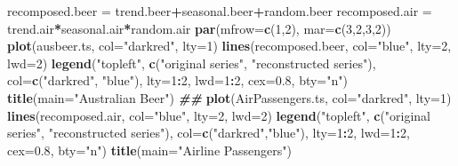 \documentclass[
]{book}
\newenvironment{Shaded}{\begin{snugshade}}{\end{snugshade}}
\newcommand{\AttributeTok}[1]{\textcolor[rgb]{0.13,0.29,0.53}{#1}}
\newcommand{\DecValTok}[1]{\textcolor[rgb]{0.00,0.00,0.81}{#1}}
\newcommand{\DocumentationTok}[1]{\textcolor[rgb]{0.56,0.35,0.01}{\textbf{\textit{#1}}}}
\newcommand{\FloatTok}[1]{\textcolor[rgb]{0.00,0.00,0.81}{#1}}
\newcommand{\FunctionTok}[1]{\textcolor[rgb]{0.13,0.29,0.53}{\textbf{#1}}}
\newcommand{\NormalTok}[1]{#1}
\newcommand{\OtherTok}[1]{\textcolor[rgb]{0.56,0.35,0.01}{#1}}
\newcommand{\SpecialCharTok}[1]{\textcolor[rgb]{0.81,0.36,0.00}{\textbf{#1}}}
\newcommand{\StringTok}[1]{\textcolor[rgb]{0.31,0.60,0.02}{#1}}
\begin{document}
\begin{Shaded}
\begin{Highlighting}[]
\NormalTok{recomposed.beer }\OtherTok{=}\NormalTok{ trend.beer}\SpecialCharTok{+}\NormalTok{seasonal.beer}\SpecialCharTok{+}\NormalTok{random.beer}
\NormalTok{recomposed.air }\OtherTok{=}\NormalTok{ trend.air}\SpecialCharTok{*}\NormalTok{seasonal.air}\SpecialCharTok{*}\NormalTok{random.air}
\FunctionTok{par}\NormalTok{(}\AttributeTok{mfrow=}\FunctionTok{c}\NormalTok{(}\DecValTok{1}\NormalTok{,}\DecValTok{2}\NormalTok{), }\AttributeTok{mar=}\FunctionTok{c}\NormalTok{(}\DecValTok{3}\NormalTok{,}\DecValTok{2}\NormalTok{,}\DecValTok{3}\NormalTok{,}\DecValTok{2}\NormalTok{))}
\FunctionTok{plot}\NormalTok{(ausbeer.ts, }\AttributeTok{col=}\StringTok{"darkred"}\NormalTok{, }\AttributeTok{lty=}\DecValTok{1}\NormalTok{)}
\FunctionTok{lines}\NormalTok{(recomposed.beer, }\AttributeTok{col=}\StringTok{"blue"}\NormalTok{, }\AttributeTok{lty=}\DecValTok{2}\NormalTok{, }\AttributeTok{lwd=}\DecValTok{2}\NormalTok{)}
\FunctionTok{legend}\NormalTok{(}\StringTok{"topleft"}\NormalTok{, }\FunctionTok{c}\NormalTok{(}\StringTok{"original series"}\NormalTok{, }\StringTok{"reconstructed series"}\NormalTok{), }
       \AttributeTok{col=}\FunctionTok{c}\NormalTok{(}\StringTok{"darkred"}\NormalTok{, }\StringTok{"blue"}\NormalTok{), }\AttributeTok{lty=}\DecValTok{1}\SpecialCharTok{:}\DecValTok{2}\NormalTok{, }\AttributeTok{lwd=}\DecValTok{1}\SpecialCharTok{:}\DecValTok{2}\NormalTok{, }\AttributeTok{cex=}\FloatTok{0.8}\NormalTok{, }\AttributeTok{bty=}\StringTok{"n"}\NormalTok{)}
\FunctionTok{title}\NormalTok{(}\AttributeTok{main=}\StringTok{"Australian Beer"}\NormalTok{)}
\DocumentationTok{\#\#}
\FunctionTok{plot}\NormalTok{(AirPassengers.ts, }\AttributeTok{col=}\StringTok{"darkred"}\NormalTok{, }\AttributeTok{lty=}\DecValTok{1}\NormalTok{)}
\FunctionTok{lines}\NormalTok{(recomposed.air, }\AttributeTok{col=}\StringTok{"blue"}\NormalTok{, }\AttributeTok{lty=}\DecValTok{2}\NormalTok{, }\AttributeTok{lwd=}\DecValTok{2}\NormalTok{)}
\FunctionTok{legend}\NormalTok{(}\StringTok{"topleft"}\NormalTok{, }\FunctionTok{c}\NormalTok{(}\StringTok{"original series"}\NormalTok{, }\StringTok{"reconstructed series"}\NormalTok{), }
       \AttributeTok{col=}\FunctionTok{c}\NormalTok{(}\StringTok{"darkred"}\NormalTok{,}\StringTok{"blue"}\NormalTok{), }\AttributeTok{lty=}\DecValTok{1}\SpecialCharTok{:}\DecValTok{2}\NormalTok{, }\AttributeTok{lwd=}\DecValTok{1}\SpecialCharTok{:}\DecValTok{2}\NormalTok{, }\AttributeTok{cex=}\FloatTok{0.8}\NormalTok{, }\AttributeTok{bty=}\StringTok{"n"}\NormalTok{)}
\FunctionTok{title}\NormalTok{(}\AttributeTok{main=}\StringTok{"Airline Passengers"}\NormalTok{)}
\end{Highlighting}
\end{Shaded}
\end{document}
